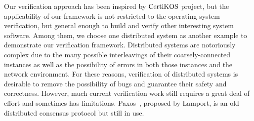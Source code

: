 
Our verification approach has been inspired by $\mathrm{CertiKOS}$ project,
but the applicability of our framework is not restricted to the operating system verification, but general enough
to build and verify other interesting system software. 
Among them, we choose one distributed system as another example to demonstrate our 
verification framework.
Distributed systems are notoriously complex due to the many possible interleavings of their coarsely-connected 
instances as well as the possibility of errors in both  those instances and the network environment. 
For these reasons, verification of distributed systems is desirable to remove the possibility of bugs and guarantee their safety and correctness. 
However, much current verification work still requires a great deal of effort and sometimes has limitations.
Paxos~\cite{paxos}, proposed by Lamport, is an old distributed consensus protocol but still in use. 



%
%
%
%
%
